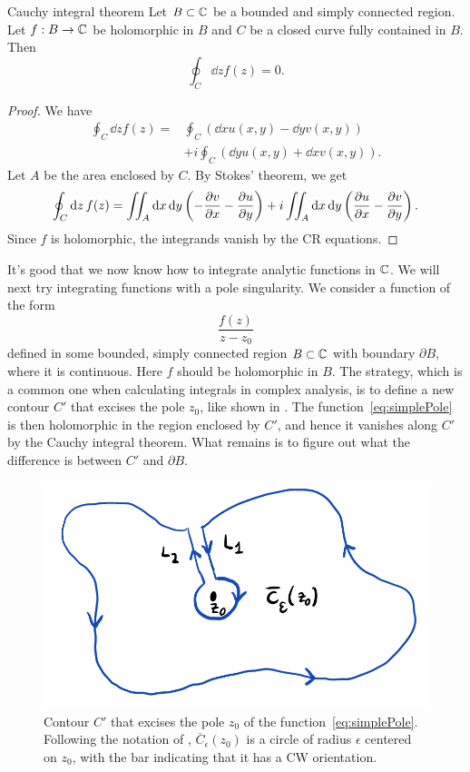 \begin{theorem}{Cauchy integral theorem}{}
Let $B\subset\mathbb{C}$ be a bounded and simply connected region. Let $f:B\to\mathbb{C}$ be
holomorphic in $B$ and $C$ be a closed curve fully contained in $B$. Then
$$
  \oint_C\dd{z}f(z)=0.
$$
\begin{proof}
We have
\begin{equation*}\begin{aligned}
\oint_C\dd{z}f(z)=&\oint_C\left(\dd{x}u(x,y)-\dd{y}v(x,y)\right)\\
                 &+i\oint_C\left(\dd{y}u(x,y)+\dd{x}v(x,y)\right).
\end{aligned}\end{equation*}
Let $A$ be the area enclosed by $C$. By Stokes' theorem, we get
\begin{equation*}
\oint_C\dd{z}f(z)=\iint_A\dd{x}\dd{y}\left(-\pdv{v}{x}-\pdv{u}{y}\right)
                   +i\iint_A\dd{x}\dd{y}\left(\pdv{u}{x}-\pdv{v}{y}\right).
\end{equation*}
Since $f$ is holomorphic, the integrands vanish by the CR equations.
\end{proof}
\end{theorem}

It's good that we now know how to integrate analytic functions in $\mathbb{C}$. We will
next try integrating functions with a pole singularity. We consider a function
of the form
\begin{equation}\label{eq:simplePole}
\frac{f(z)}{z-z_0}
\end{equation}
defined in some bounded, simply connected region $B\subset\mathbb{C}$ with boundary
$\partial B$, where it is continuous. Here $f$ should be holomorphic in $B$.
The strategy, which is a
common one when calculating integrals in complex analysis, is to define a new
contour $C'$ that excises the pole $z_0$, like shown in .
The function~\eqref{eq:simplePole} is then holomorphic in the region
enclosed by $C'$, and hence it vanishes along $C'$ by the Cauchy integral
theorem.
What remains is to figure out what the difference is between $C'$ and 
$\partial B$.

\begin{figure}
\centering
\includegraphics[width=0.6\linewidth]{figs/cauchy_integral-cropped.pdf}
\caption{Contour $C'$ that excises the pole $z_0$ of the
function~\eqref{eq:simplePole}. Following the notation of
, $\overline{C}_{\epsilon}(z_0)$ is a circle of
radius $\epsilon$ centered on $z_0$, with the bar indicating that it has a CW
orientation.}
\label{fig:cauchy}
\end{figure}

